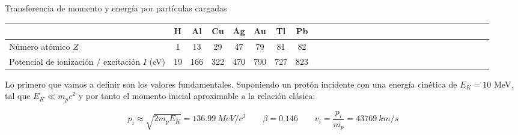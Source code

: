 \begin{Ejercicio}{Transferencia de momento y energía por partículas cargadas}
\begin{center}
\begin{tabular}{lcccccccccccccccccccccccccccc}
\toprule & H & Al & Cu & Ag & Au & Tl & Pb \\
\midrule
Número atómico $Z$ & 1 & 13 & 29 & 47 & 79 & 81 & 82 \\
Potencial de ionización / excitación $I$ (eV) & 19 & 166 & 322 & 470 & 790 & 727 & 823 \\
\bottomrule
\end{tabular}
\end{center}
\captionsetup[table]{justification=centering}
\end{Ejercicio}

Lo primero que vamos a definir son los valores fundamentales. Suponiendo un protón incidente con una energía cinética de $E_K=10$ MeV, tal que $E_K\ll m_p c^2$ y por tanto el momento inicial aproximable a la relación clásica:

\begin{equation*}
    p_i \approx \sqrt{2 m_p E_K} = 136.99 \ \unit{MeV/c^2} \qquad \beta= 0.146  \qquad 
        v_i = \frac{p_i}{m_p} = 43769 \ \unit{km/s}
\end{equation*}

